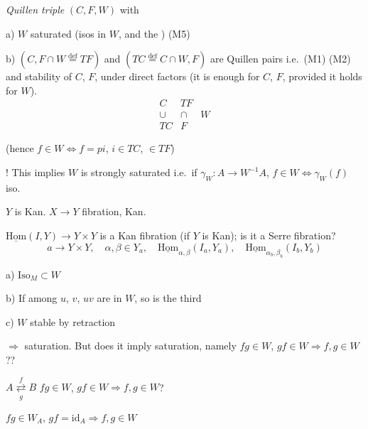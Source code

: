\documentclass[11pt,a4paper]{article}
\begin{document}
\emph{Quillen triple} $(C, F, W)$  with

a) $W$ \struck{\ill{}}  saturated (isos in $W$,
 and the \ill{} \ill{} ) (M5)

b) $(C, F \cap W \overset{\text{def}}{=} TF)$ and
$(TC \overset{\text{def}}{=} C \cap W, F)$ are Quillen pairs i.e.\ (M1)
(M2) and stability of $C$, $F$,   under direct
factors (it is enough for $C$, $F$, provided it holds for $W$).
\[
  \begin{array}{ccc}
    C & TF & \\
    \cup & \cap & W \\
    TC & F &
  \end{array}
\]

(hence $f \in W \Longleftrightarrow f = pi$, $i \in TC$,
${} \in TF$)

! This implies $W$ is strongly saturated i.e.\ if
$\gamma_W : A \to W^{-1}A$, $f \in W \Longleftrightarrow \gamma_W(f)$ iso.

$Y$ is Kan. \qquad $X \to Y$ fibration, Kan.

$\underline{\mathrm{Hom}}(I, Y) \to Y \times Y$ is a Kan fibration (if $Y$
is Kan); is it a Serre fibration?
\[
  a \to Y \times Y, \quad \alpha, \beta \in Y_a, \quad
  \underline{\mathrm{Hom}}_{\alpha,\beta}(I_a, Y_a), \quad
  \underline{\mathrm{Hom}}_{\alpha_b, \beta_b}(I_b, Y_b)
\]

a) $\mathrm{Iso}_M \subset W$

b) If \ill{} \ill{} among $u$, $v$, $uv$  are in $W$, so is
the third

c) $W$ stable by retraction 

$\Rightarrow$  saturation. But does it imply saturation,
namely $fg \in W$, $gf \in W \Longrightarrow f, g \in W$??

$A \underset{g}{\overset{f}{\rightleftarrows}} B$ \qquad
$fg \in W$, $gf \in W \Longrightarrow f, g \in W$?

$fg \in W_A$, $gf = \mathrm{id}_A \Longrightarrow f, g \in W$
\end{document}

